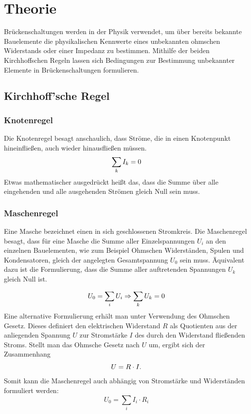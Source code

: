 \section{Theorie}
\label{sec:Theorie}
Brückenschaltungen werden in der Physik verwendet, um über bereits bekannte Bauelemente die
physikalischen Kennwerte eines unbekannten ohmschen Widerstands oder einer Impedanz zu bestimmen.
Mithilfe der beiden Kirchhoffschen Regeln lassen sich Bedingungen zur Bestimmung unbekannter Elemente in
Brückenschaltungen formulieren.
\subsection{Kirchhoff'sche Regel}

\subsubsection{Knotenregel}
Die Knotenregel besagt anschaulich, dass Ströme, die in einen Knotenpunkt
hineinfließen, auch wieder hinausfließen müssen.
\begin{equation}
  \centering
  \label{eqn:knotenregel}
\sum_{k}{I_k}=0
\end{equation}
Etwas mathematischer ausgedrückt heißt das, dass die Summe über alle eingehenden
und alle ausgehenden Strömen gleich Null sein muss.

\subsubsection{Maschenregel}
Eine Masche bezeichnet einen in sich geschlossenen Stromkreis.
Die Maschenregel besagt, dass für eine Masche die Summe aller Einzelspannungen $U_i$
an den einzelnen Bauelementen, wie zum Beispiel Ohmschen Widerständen, Spulen und Kondensatoren,
gleich der angelegten Gesamtspannung $U_0$ sein muss. Äquivalent dazu ist die Formulierung, dass die Summe aller auftretenden Spannungen $U_k$ gleich Null ist.

\begin{equation}
  \label{eqn:maschenregel}
  \centering
U_0=\sum_{i}{U_i} \Rightarrow \sum_{k}{U_k}=0
\end{equation}
 Eine alternative Formulierung erhält man unter Verwendung des Ohmschen Gesetz. Dieses definiert den elektrischen Widerstand $R$
 als Quotienten aus der anliegenden Spannung $U$ zur Stromstärke $I$ des durch den Widerstand fließenden Stroms.
 Stellt man das Ohmsche Gesetz nach $U$ um, ergibt sich der Zusammenhang
\begin{equation}
   \centering
   U=R \cdot I \text{.}
 \end{equation}
 Somit kann die Maschenregel auch abhängig von Stromstärke und Widerständen formuliert werden:
 \begin{equation}
   U_0=\sum_{i}{I_i \cdot R_i}
\end{equation}


